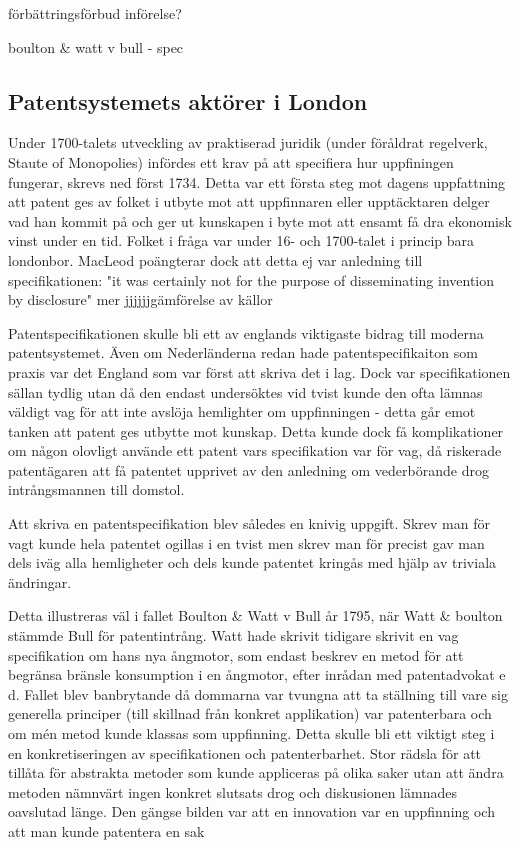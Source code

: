 förbättringsförbud införelse?

boulton & watt v bull - spec

\subsection{Patentsystemets aktörer i London} %
\label{sub:patentsystemets_uppkomst_i_london}

Under 1700-talets utveckling av praktiserad juridik (under föråldrat regelverk, Staute of Monopolies) infördes ett krav på att specifiera hur uppfiningen fungerar, skrevs ned först 1734. Detta
var ett första steg mot dagens uppfattning att patent ges av folket i utbyte mot att uppfinnaren eller
upptäcktaren delger vad han kommit på och ger ut kunskapen i byte mot att ensamt få dra ekonomisk vinst
under en tid. Folket i fråga var under 16- och 1700-talet i princip bara londonbor. MacLeod poängterar dock att detta ej var anledning till specifikationen: "it was certainly not for the purpose of disseminating invention by disclosure" \cite{macleod2} mer jjjjjjgämförelse av källor

Patentspecifikationen skulle bli ett av englands viktigaste bidrag till
moderna patentsystemet. Även om
Nederländerna redan hade patentspecifikaiton som praxis var det England som var först att skriva det i
lag. \cite{macleod} Dock var specifikationen sällan tydlig utan då den endast undersöktes vid tvist
kunde den ofta lämnas väldigt vag för att inte avslöja hemlighter om uppfinningen - detta går emot tanken
att patent ges utbytte mot kunskap. Detta kunde dock få komplikationer om någon olovligt använde ett
patent vars specifikation var för vag, då riskerade patentägaren att få patentet upprivet av den anledning om vederbörande drog intrångsmannen till domstol.

Att skriva en patentspecifikation blev således en knivig uppgift. Skrev man för vagt kunde hela patentet
ogillas i en tvist men skrev man för precist gav man dels iväg alla hemligheter och dels kunde patentet
kringås med hjälp av triviala ändringar\cite{macleod}. 

Detta illustreras väl i fallet Boulton & Watt v Bull år 1795, när Watt & boulton stämmde Bull för patentintrång. Watt hade skrivit tidigare skrivit en vag specifikation om hans nya ångmotor, som endast beskrev en metod för att begränsa bränsle konsumption i en ångmotor, efter inrådan med patentadvokat e d\cite{bracha}. Fallet blev banbrytande då dommarna var tvungna att ta ställning till vare sig generella principer (till skillnad från konkret applikation) var patenterbara och om mén metod kunde klassas som uppfinning\cite{bracha}. Detta skulle bli ett viktigt steg i en konkretiseringen av specifikationen och patenterbarhet. Stor rädsla för att tillåta för abstrakta metoder som kunde appliceras på olika saker utan att ändra metoden nämnvärt ingen konkret slutsats drog och diskusionen lämnades oavslutad länge. Den gängse bilden var att en innovation var en uppfinning och att man kunde patentera en sak \cite{bracha}

